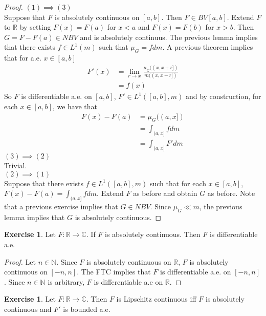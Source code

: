 \documentclass[12pt]{amsart}
\theoremstyle{definition}
\newtheorem{ex}[definition]{Exercise}
\newcommand{\C}{\mathbb{C}}
\newcommand{\N}{\mathbb{N}}
\newcommand{\R}{\mathbb{R}}
\newcommand{\lex}[1]{\label{ex:#1}}
\begin{document}
	\begin{proof}
		$(1) \implies (3)$ \\
		Suppose that $F$ is absolutely continuous on $[a,b]$. Then $F \in BV[a,b]$. Extend $F$ to $\R$ by setting $F(x) = F(a)$ for $x<a$ and $F(x)=F(b)$ for $x>b$. Then $G=F-F(a) \in NBV$ and is absolutely continuus. The previous lemma implies that there exists $f \in L^1(m)$ such that $\mu_G = fdm$. A previous theorem implies that for a.e. $x \in [a,b]$
		\begin{align*}
			F'(x) 
			&= \lim_{r \rightarrow x} \frac{\mu_G((x,x+r])}{m((x,x+r])}\\
			&= f(x)
		\end{align*}  
		So $F$ is differentiable a.e. on $[a,b]$, $F' \in L^1([a,b], m)$ and by construction, for each $x \in [a,b]$, we have that
		\begin{align*}
			F(x)-F(a)
			&= \mu_G((a,x])\\
			&= \int_{(a,x]}fdm\\
			&= \int_{(a,x]}F'dm
		\end{align*}
		$(3) \implies (2)$\\
		Trivial.\\
		$(2) \implies (1)$\\
		Suppose that there exists $f \in L^1([a,b], m)$ such that for each $x \in [a,b]$, $F(x)-F(a)=\int_{(a,x]}fdm$. Extend $F$ as before and obtain $G$ as before. Note that a previous exercise implies that $G \in NBV$. Since $\mu_G \ll m$, the previous lemma implies that $G$ is absolutely continuous.
	\end{proof}
	
	\begin{ex} \lex{00000} 
		Let $F: \R \rightarrow \C$. If $F$ is absolutely continuous. Then $F$ is differentiable a.e.
	\end{ex}
	
	\begin{proof}
		Let $n \in \N$. Since $F$ is absolutely continuous on $\R$, $F$ is absolutely continuous on $[-n,n]$. The FTC implies that $F$ is differentiable a.e. on $[-n,n]$. Since $n \in \N$ is arbitrary, $F$ is differentiable a.e on $\R$.
	\end{proof}
	
	\begin{ex} \lex{00000} 
		Let $F: \R \rightarrow \C$. Then $F$ is Lipschitz continuous iff $F$ is absolutely continuous and $F'$ is bounded a.e.
	\end{ex}
	
\end{document}
